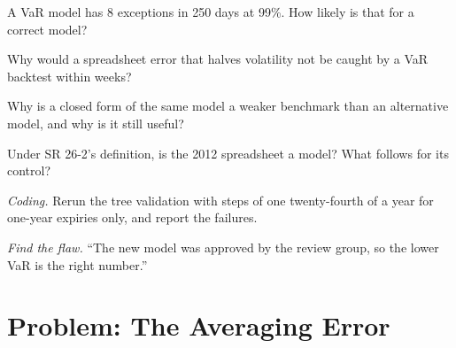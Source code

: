 \begin{exercise}[$\star$]\label{exo:rc:model-risk-and-validation:3}
A VaR model has 8 exceptions in 250 days at 99\%. How likely is that for a correct model?
\end{exercise}

\begin{exercise}[$\star\star$]\label{exo:rc:model-risk-and-validation:4}
Why would a spreadsheet error that halves volatility not be caught by a VaR backtest within weeks?
\end{exercise}

\begin{exercise}[$\star\star$]\label{exo:rc:model-risk-and-validation:5}
Why is a closed form of the same model a weaker benchmark than an alternative model, and why is it
still useful?
\end{exercise}

\begin{exercise}[$\star\star$]\label{exo:rc:model-risk-and-validation:6}
Under SR 26-2's definition, is the 2012 spreadsheet a model? What follows for its control?
\end{exercise}

\begin{exercise}[$\star\star\star$]\label{exo:rc:model-risk-and-validation:7}
\emph{Coding.} Rerun the tree validation with steps of one twenty-fourth of a year for one-year
expiries only, and report the failures.
\end{exercise}

\begin{exercise}[$\star\star\star$]\label{exo:rc:model-risk-and-validation:8}
\emph{Find the flaw.} ``The new model was approved by the review group, so the lower VaR is the right
number.''
\end{exercise}

\section{Problem: The Averaging Error}

